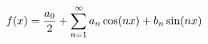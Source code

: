\documentclass[preview]{standalone}
\begin{document}
\begin{align*}
\special{dvisvgm:raw <g id='unique000'>}f(x) = \frac{a_0}{2} + \sum_{n=1}^{\infty} a_n\cos(nx) + b_n\sin(nx)\special{dvisvgm:raw </g>}
\end{align*}
\end{document}
